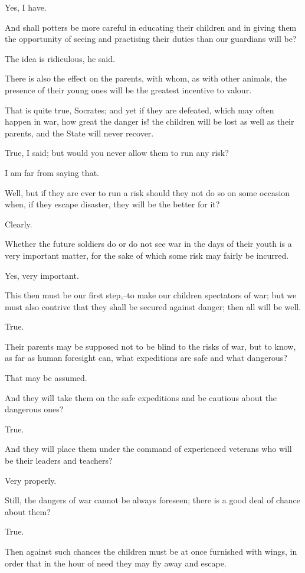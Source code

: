 Yes, I have.

And shall potters be more careful in educating their children and in
giving them the opportunity of seeing and practising their duties than
our guardians will be?

The idea is ridiculous, he said.

There is also the effect on the parents, with whom, as with other
animals, the presence of their young ones will be the greatest incentive
to valour.

That is quite true, Socrates; and yet if they are defeated, which may
often happen in war, how great the danger is! the children will be lost
as well as their parents, and the State will never recover.

True, I said; but would you never allow them to run any risk?

I am far from saying that.

Well, but if they are ever to run a risk should they not do so on some
occasion when, if they escape disaster, they will be the better for it?

Clearly.

Whether the future soldiers do or do not see war in the days of their
youth is a very important matter, for the sake of which some risk may
fairly be incurred.

Yes, very important.

This then must be our first step,--to make our children spectators
of war; but we must also contrive that they shall be secured against
danger; then all will be well.

True.

Their parents may be supposed not to be blind to the risks of war, but
to know, as far as human foresight can, what expeditions are safe and
what dangerous?

That may be assumed.

And they will take them on the safe expeditions and be cautious about
the dangerous ones?

True.

And they will place them under the command of experienced veterans who
will be their leaders and teachers?

Very properly.

Still, the dangers of war cannot be always foreseen; there is a good
deal of chance about them?

True.

Then against such chances the children must be at once furnished with
wings, in order that in the hour of need they may fly away and escape.

